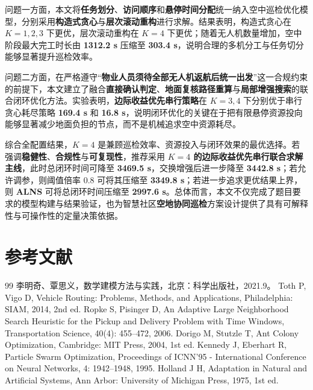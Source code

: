 \documentclass[12pt]{article}
\begin{document}
问题一方面，本文将\textbf{任务划分}、\textbf{访问顺序}和\textbf{悬停时间分配}统一纳入空中巡检优化模型，分别采用\textbf{构造式贪心}与\textbf{层次滚动重构}进行求解。结果表明，构造式贪心在 \textbf{$K=1,2,3$} 下更优，层次滚动重构在 \textbf{$K=4$} 下更优；随着无人机数量增加，空中阶段最大完工时长由 \textbf{1312.2 s} 压缩至 \textbf{303.4 s}，说明合理的多机分工与任务切分能够显著提升巡检效率。

问题二方面，在严格遵守“\textbf{物业人员须待全部无人机返航后统一出发}”这一合规约束的前提下，本文建立了融合\textbf{直接确认判定}、\textbf{地面复核路径重算}与\textbf{局部增强搜索}的联合闭环优化方法。实验表明，\textbf{边际收益优先串行策略}在 \textbf{$K=3,4$} 下分别优于串行贪心耗尽策略 \textbf{169.4 s} 和 \textbf{16.8 s}，说明闭环优化的关键在于把有限悬停资源投向能够显著减少地面负担的节点，而不是机械追求空中资源耗尽。

综合全配置结果，\textbf{$K=4$} 是兼顾巡检效率、资源投入与闭环效果的最优选择。若强调\textbf{稳健性}、\textbf{合规性}与\textbf{可复现性}，推荐采用 \textbf{$K=4$ 的边际收益优先串行联合求解主线}，此时总闭环时间可降至 \textbf{3469.5 s}，交换增强后进一步降至 \textbf{3442.8 s}；若允许调参，则阈值倍率 \textbf{$0.8$} 可将其压缩至 \textbf{3349.8 s}；若进一步追求更优结果上界，则 \textbf{ALNS} 可将总闭环时间压缩至 \textbf{2997.6 s}。总体而言，本文不仅完成了题目要求的模型构建与结果验证，也为智慧社区\textbf{空地协同巡检}方案设计提供了具有可解释性与可操作性的定量决策依据。

\section{参考文献}
\begin{thebibliography}{99}
 李明奇、覃思义，数学建模方法与实践，北京：科学出版社，2021.9。
 Toth P, Vigo D, Vehicle Routing: Problems, Methods, and Applications, Philadelphia: SIAM, 2014, 2nd ed.
 Ropke S, Pisinger D, An Adaptive Large Neighborhood Search Heuristic for the Pickup and Delivery Problem with Time Windows, Transportation Science, 40(4): 455--472, 2006.
 Dorigo M, Stutzle T, Ant Colony Optimization, Cambridge: MIT Press, 2004, 1st ed.
 Kennedy J, Eberhart R, Particle Swarm Optimization, Proceedings of ICNN'95 - International Conference on Neural Networks, 4: 1942--1948, 1995.
 Holland J H, Adaptation in Natural and Artificial Systems, Ann Arbor: University of Michigan Press, 1975, 1st ed.
\end{thebibliography}
\end{document}
